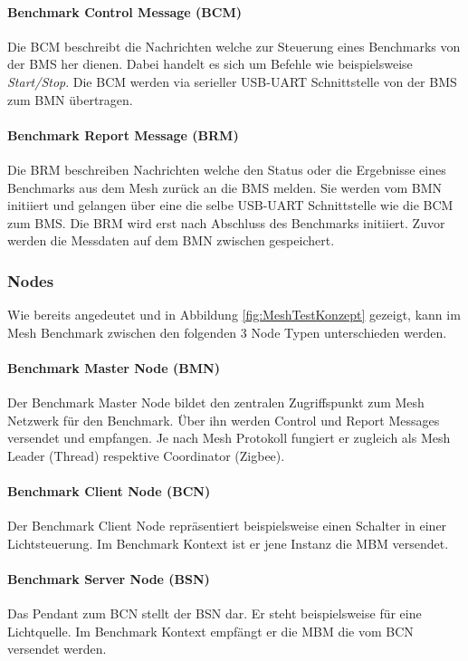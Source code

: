 \paragraph{Benchmark Control Message (BCM)}
Die BCM beschreibt die Nachrichten welche zur Steuerung eines Benchmarks von der BMS her dienen. Dabei handelt es sich um Befehle wie beispielsweise \textit{Start/Stop}. Die BCM werden via serieller USB-UART Schnittstelle von der BMS zum BMN übertragen.

\paragraph{Benchmark Report Message (BRM)}
Die BRM beschreiben Nachrichten welche den Status oder die Ergebnisse eines Benchmarks aus dem Mesh zurück an die BMS melden. Sie werden vom BMN initiiert und gelangen über eine die selbe USB-UART Schnittstelle wie die BCM zum BMS. Die BRM wird erst nach Abschluss des Benchmarks initiiert. Zuvor werden die Messdaten auf dem BMN zwischen gespeichert.


\subsubsection{Nodes}\label{subsubsec:Nodes}
Wie bereits angedeutet und in Abbildung \ref{fig:MeshTestKonzept} gezeigt, kann im Mesh Benchmark zwischen den folgenden 3 Node Typen unterschieden werden.

\paragraph{Benchmark Master Node (BMN)}
Der Benchmark Master Node bildet den zentralen Zugriffspunkt zum Mesh Netzwerk für den Benchmark. Über ihn werden Control und Report Messages versendet und empfangen. Je nach Mesh Protokoll fungiert er zugleich als Mesh Leader (Thread) respektive Coordinator (Zigbee).

\paragraph{Benchmark Client Node (BCN)}
Der Benchmark Client Node repräsentiert beispielsweise einen Schalter in einer Lichtsteuerung. Im Benchmark Kontext ist er jene Instanz die MBM versendet.

\paragraph{Benchmark Server Node (BSN)}
Das Pendant zum BCN stellt der BSN dar. Er steht beispielsweise für eine Lichtquelle. Im Benchmark Kontext empfängt er die MBM die vom BCN versendet werden.


